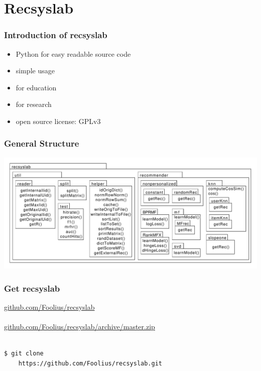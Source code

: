 \documentclass{beamer}
\begin{document}
\section{Recsyslab}
\begin{frame} 
\frametitle{Introduction of recsyslab} %
\begin{itemize}
    \item Python for easy readable source code
    \item simple usage
    \item for education
    \item for research
    \item open source license: GPLv3
\end{itemize}
\end{frame}
\begin{frame}
\frametitle{General Structure}
\begin{center}
    \includegraphics[page=1, scale=0.3]{packagediagram.pdf}
\end{center}
\end{frame}
\begin{frame}[fragile]
    \frametitle{Get recsyslab}
    \url{github.com/Foolius/recsyslab}\\
    \hspace*{8cm}\\
    \url{github.com/Foolius/recsyslab/archive/master.zip}\\
    \hspace*{8cm}\\
    \begin{lstlisting}[style=pseudocode]
$ git clone 
    https://github.com/Foolius/recsyslab.git
    \end{lstlisting}
\end{frame}



\end{document}
